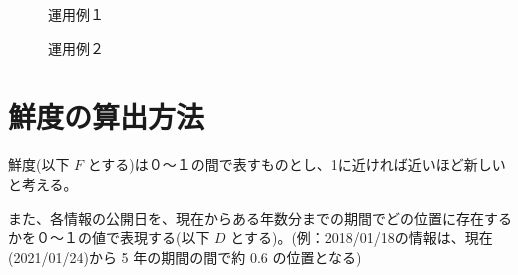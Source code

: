 \begin{figure}[htbp]
  \begin{minipage}{0.5\hsize}
    \begin{center}
    \end{center}
    \caption{運用例１}
  \end{minipage}
  \begin{minipage}{0.5\hsize}
    \begin{center}
    \end{center}
    \caption{運用例２}
  \end{minipage}
\end{figure}

\section{鮮度の算出方法}
\label{sec:imp_calculation}

鮮度(以下 $F$ とする)は０～１の間で表すものとし、1に近ければ近いほど新しいと考える。

また、各情報の公開日を、現在からある年数分までの期間でどの位置に存在するかを０～１の値で表現する(以下 $D$ とする)。(例：2018/01/18の情報は、現在(2021/01/24)から 5 年の期間の間で約 0.6 の位置となる)

